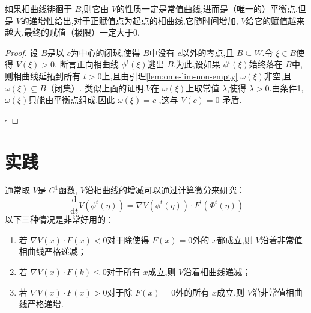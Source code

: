 \documentclass[lang=cn,12pt,color=green,fontset=none]{elegantbook}
\begin{document}
\begin{note}
    如果相曲线徘徊于 $ B $,则它由 $ V $的性质一定是常值曲线,进而是（唯一的）平衡点.但是 $ V $的递增性给出,对于正赋值点为起点的相曲线,它随时间增加, $ V $给它的赋值越来越大,最终的赋值（极限）一定大于0.    
\end{note}
\begin{proof}
    设 $ B $是以 $ c $为中心的闭球,使得 $ B $中没有 $ c $以外的零点,且 $ B\subseteq W $.令 $  \xi \in B $使得 $ V\left(  \xi  \right)>0  $. 断言正向相曲线 $ \phi ^{t}\left(  \xi  \right)  $逃出 $ B $.为此,设如果 $ \phi ^{t}\left(  \xi  \right)  $始终落在 $ B $中,则相曲线延拓到所有 $ t>0 $上,且由引理\ref{lem:ome-lim-non-empty} $  \omega \left(  \xi  \right)  $非空,且 $  \omega \left(  \xi  \right)\subseteq B  $（闭集）. 类似上面的证明,$ V $在 $  \omega \left(  \xi  \right)  $上取常值 $ \lambda  $,使得 $ \lambda >0 $.由条件1,$  \omega \left(  \xi  \right)  $只能由平衡点组成.因此 $  \omega \left(  \xi  \right)=c  $    ,这与 $ V\left( c \right)=0  $ 矛盾.

    \hfill $\square$
\end{proof}

\section{实践}

通常取 $ V $是 $ C^{1} $函数, $ V $沿相曲线的增减可以通过计算微分来研究： $$
\frac{\,\mathrm{d}  }{\,\mathrm{d} t } V\left( \phi ^{t}\left( \eta  \right)  \right) = \nabla V\left( \phi ^{t}\left( \eta  \right)  \right)\cdot F^{\prime} \left( \Phi ^{t}\left( \eta  \right)  \right)    
$$   以下三种情况是非常好用的：
\begin{enumerate}
    \item 若 $ \nabla V\left( x \right)\cdot F\left( x \right)<0   $对于除使得 $ F\left( x \right) = 0  $外的 $ x $都成立,则 $ V $沿着非常值相曲线严格递减；
    \item 若 $ \nabla V\left( x \right)\cdot F\left( k \right)\le 0   $对于所有 $ x $成立,则 $ V $沿着相曲线递减；
    \item 若 $ \nabla V\left( x \right)\cdot F\left( x \right)>0   $对于除 $ F\left( x \right)=0  $外的所有 $ x $成立,则 $ V $沿非常值相曲线严格递增.           
\end{enumerate}
\end{document}
